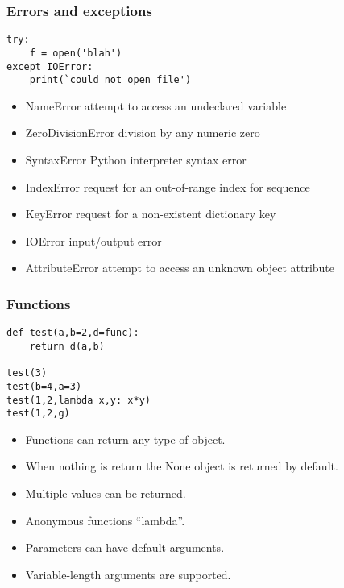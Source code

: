 \begin{frame}[fragile]\frametitle{Errors and exceptions}
  \begin{lstlisting}
try:
	f = open('blah')
except IOError:
	print(`could not open file')
  \end{lstlisting}
  \begin{itemize}
  \item NameError attempt to access an undeclared variable
  \item ZeroDivisionError division by any numeric zero
  \item SyntaxError Python interpreter syntax error
  \item IndexError request for an out-of-range index for sequence
  \item KeyError request for a non-existent dictionary key
  \item IOError input/output error
  \item AttributeError attempt to access an unknown object attribute
  \end{itemize}
\end{frame}


\begin{frame}[fragile]\frametitle{Functions}
  \begin{lstlisting}
def test(a,b=2,d=func):
    return d(a,b)
	
test(3)
test(b=4,a=3)
test(1,2,lambda x,y: x*y)
test(1,2,g)
  \end{lstlisting}
  \begin{itemize}
  \item Functions can return any type of object.
  \item When nothing is return the None object is returned by default.
  \item Multiple values can be returned.
  \item Anonymous functions ``lambda''.
  \item Parameters can have default arguments.
  \item Variable-length arguments are supported.
  \end{itemize}
\end{frame}

